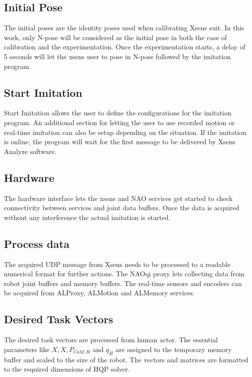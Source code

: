 \subsection*{Initial Pose}

The initial poses are the identity poses used when calibrating Xsens suit. In this work, only N-pose will be considered as the initial pose in both the case of calibration
and the experimentation. Once the experimentation starts, a delay of 5 seconds will let the xsens user to pose in N-pose followed by the imitation program.

\subsection*{Start Imitation}

Start Imitation allows the user to define the configurations for the imitation program. An additional section for letting the user to use recorded motion or real-time 
imitation can also be setup depending on the situation. If the imitation is online, the program will wait for the first message to be delivered by Xsens Analyze software.

\subsection*{Hardware}

The hardware interface lets the xsens and NAO services get started to check connectivity between services and joint data buffers. Once the data is acquired without
any interference the actual imitation is started.

\subsection*{Process data}

The acquired UDP message from Xsens needs to be processed to a readable numerical format for further actions. The NAOqi proxy lets collecting data from robot joint buffers and memory 
buffers. The real-time sensors and encoders can be acquired from ALProxy, ALMotion and ALMemory services.

\subsection*{Desired Task Vectors}

The desired task vectors are processed from human actor. The essential parameters like $X, \ddot{X}, P_{CoM, H}$ and $q_{H}$ are assigned to the temporary memory buffer and scaled to the size 
of the robot. The vectors and matrices are formatted to the required dimensions of HQP solver.

